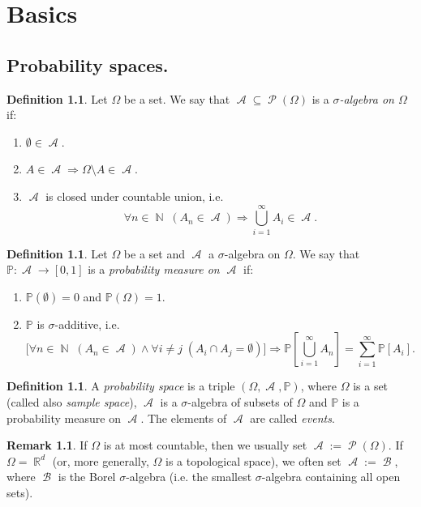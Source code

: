 \documentclass[12pt,a4paper]{report}
\theoremstyle{definition}
\newtheorem{definition}[theorem]{Definition}
\newtheorem*{remark}{Remark}
\theoremstyle{num.custom-title}
\DeclareMathOperator{\A}{\mathcal{A}}
\DeclareMathOperator{\B}{\mathcal{B}}
\DeclareMathOperator{\PP}{\mathcal{P}}
\DeclareMathOperator{\N}{\mathbb{N}}
\DeclareMathOperator{\R}{\mathbb{R}}
\DeclareMathOperator{\imp}{\Rightarrow}
\DeclareMathOperator{\sm}{\setminus}
\DeclareMathOperator{\sse}{\subseteq}
\renewcommand{\1}{\mathbbm{1}}
\renewcommand{\P}{\mathbb{P}}
\begin{document}
\chapter{Basics}

\section{Probability spaces.}

\begin{definition}
Let $\Omega$ be a set. We say that $\A \sse \PP(\Omega)$ is a \emph{$\sigma$-algebra on $\Omega$} if:
\begin{enumerate}
\item $\emptyset \in \A$.
\item $A \in \A \imp \Omega \sm A \in \A$.
\item $\A$ is closed under countable union, i.e. 
\[
\forall n \in \N \; (A_n \in \A) \imp \bigcup_{i=1}^\infty A_i \in \A.
\]
\end{enumerate}
\end{definition}

\begin{definition}
Let $\Omega$ be a set and $\A$ a $\sigma$-algebra on $\Omega$. We say that $\P : \A \to [0,1]$ is a \emph{probability measure on $\A$} if:
\begin{enumerate}
\item $\P(\emptyset)=0$ and $\P(\Omega)=1$.
\item $\P$ is $\sigma$-additive, i.e.
\[
\Big[ \forall n \in \N \; (A_n \in \A) \wedge \forall i \neq j \; (A_i \cap A_j = \emptyset) \Big] \imp \P \left[ \bigcup_{i=1}^\infty A_n \right] = \sum_{i=1}^\infty \P[A_i].
\]
\end{enumerate}
\end{definition}

\begin{definition}
A \emph{probability space} is a triple $(\Omega, \A, \P)$, where $\Omega$ is a set (called also \emph{sample space}), $\A$ is a $\sigma$-algebra of subsets of $\Omega$ and $\P$ is a probability measure on $\A$. The elements of $\A$ are called \emph{events}.
\end{definition}

\begin{remark}
If $\Omega$ is at most countable, then we usually set $\A := \PP(\Omega)$. If $\Omega = \R^d$ (or, more generally, $\Omega$ is a topological space), we often set $\A := \B$, where $\B$ is the Borel $\sigma$-algebra (i.e. the smallest $\sigma$-algebra containing all open sets).
\end{remark}
\end{document}
